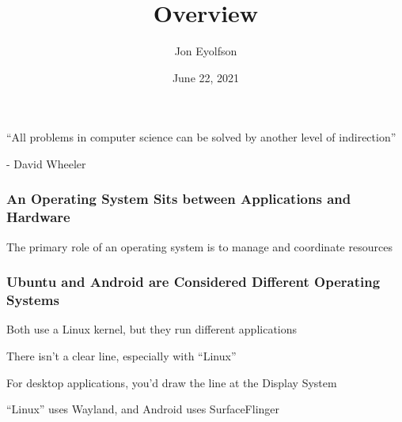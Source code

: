 

\title{Overview}
\author{Jon Eyolfson}
\date{June 22, 2021}



  \begin{frame}
    \titlepage
  \end{frame}
  
  \begin{frame}
    \vfill
    ``All problems in computer science can be solved by another level of
    indirection''

    \begin{flushright}
      - David Wheeler
    \end{flushright}
    \vfill
  \end{frame}

  \begin{frame}
    \frametitle{An Operating System Sits between Applications and Hardware}

    \centering

    \begin{flushright}
      The primary role of an operating system is to manage and coordinate resources
    \end{flushright}
  \end{frame}

  \begin{frame}
    \frametitle{Ubuntu and Android are Considered Different Operating Systems}

    Both use a Linux kernel, but they run different applications

    \vspace{2em}

    There isn't a clear line, especially with ``Linux''

    \vspace{4em}

    For desktop applications, you'd draw the line at the Display System

    \vspace{2em}

    ``Linux'' uses Wayland, and Android uses SurfaceFlinger
  \end{frame}

